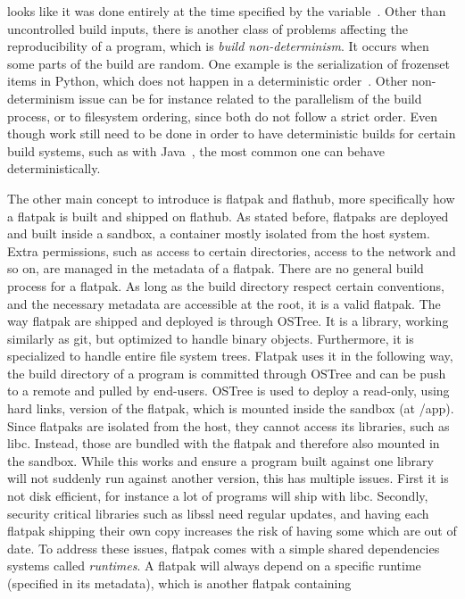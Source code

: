 \documentclass[a4paper,11pt,oneside]{report}
\theoremstyle{definition}
\newcommand{\fp}{flatpak\xspace}
\newcommand{\Fp}{Flatpak\xspace}
\newcommand{\fh}{flathub\xspace}
\newcommand{\ot}{OSTree\xspace}
\begin{document}
looks like it was done entirely at the time specified by the
variable~\cite{rb:sde}.
Other than uncontrolled build inputs, there is another class of problems
affecting the reproducibility of a program, which is \emph{build
non-determinism}. It occurs when some parts of the build are random. One
example is the serialization of frozenset items in Python, which does not
happen in a deterministic order~\cite{gh:pyc-frozenset}. Other non-determinism
issue can be for instance related to the parallelism of the build process, or
to filesystem ordering, since both do not follow a strict order. Even though
work still need to be done in order to have deterministic builds for certain
build systems, such as with Java~\cite{xiong2022towards}, the most common one
can behave deterministically.


The other main concept to introduce is \fp and \fh, more specifically how a \fp
is built and shipped on \fh. As stated before, flatpaks are deployed and built
inside a sandbox, a container mostly isolated from the host system. Extra
permissions, such as access to certain directories, access to the network and
so on, are managed in the metadata of a \fp. There are no general build process
for a \fp. As long as the build directory respect certain conventions, and the
necessary metadata are accessible at the root, it is a valid \fp. The way \fp
are shipped and deployed is through \ot. It is a library, working similarly as
git, but optimized to handle binary objects. Furthermore, it is specialized to
handle entire file system trees. \Fp uses it in the following way, the build
directory of a program is committed through \ot and can be push to a remote and
pulled by end-users. \ot is used to deploy a read-only, using hard links,
version of the \fp, which is mounted inside the sandbox (at /app). Since
flatpaks are isolated from the host, they cannot access its libraries, such as
libc. Instead, those are bundled with the \fp and therefore also mounted in the
sandbox. While this works and ensure a program built against one library will
not suddenly run against another version, this has multiple issues. First it is
not disk efficient, for instance a lot of programs will ship with libc.
Secondly, security critical libraries such as libssl need regular updates, and
having each \fp shipping their own copy increases the risk of having some which
are out of date. To address these issues, \fp comes with a simple shared
dependencies systems called \emph{runtimes}. A \fp will always depend on a
specific runtime (specified in its metadata), which is another \fp containing
\end{document}
